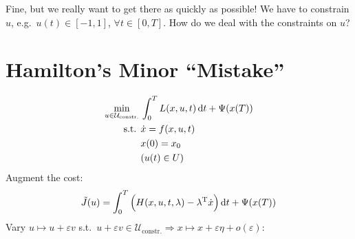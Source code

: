 Fine, but we really want to get there as quickly as possible! We have to constrain $u$, e.g.\ $u(t)\in[-1,1]$, $\forall t\in[0,T]$. How do we deal with the constraints on $u$?

\section{Hamilton's Minor ``Mistake''}

\begin{align}
  \min_{u\in\mathcal{U}_{\text{constr.}}} {} & \int_0^T L(x,u,t)\mathop{}\!\mathrm{d} t + \Psi(x(T)) \\
  \text{s.t. } & \dot x = f(x,u,t) \\
            & x(0) = x_0 \\
            & ( u(t) \in U )
\end{align}
Augment the cost:
\begin{gather}
  \tilde J(u) = \int_0^T \Big( H(x,u,t,\lambda) - \lambda^\text{T} \dot x \Big) \mathop{}\!\mathrm{d} t + \Psi(x(T))
\end{gather}
Vary $u\mapsto u+\varepsilon v$ s.t.\ $u+\varepsilon v\in\mathcal U_{\text{constr.}} \Rightarrow x\mapsto x +\varepsilon\eta+o(\varepsilon)$:
